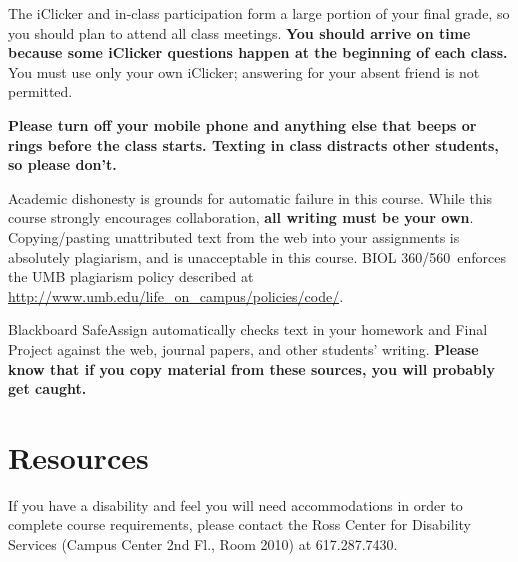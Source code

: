 \documentclass[12pt]{article}
\newcommand{\course}{BIOL 360/560}
\begin{document}
The iClicker and in-class participation form a large portion of your final
grade, so you should plan to attend all class meetings.  \textbf{You should
  arrive on time because some iClicker questions happen at the beginning of each
  class.}  You must use only your own iClicker; answering for your absent
friend is not permitted.


\textbf{Please turn off your mobile phone and anything else that beeps or rings before
the class starts.  Texting in class distracts other students, so please don't.}


Academic dishonesty is grounds for automatic failure in this course.  While this
course strongly encourages collaboration, \textbf{all writing must be your own}.
Copying/pasting unattributed text from the web into your assignments is
absolutely plagiarism, and is unacceptable in this course.   \course\ enforces
the UMB plagiarism policy described at
\url{http://www.umb.edu/life_on_campus/policies/code/}.


Blackboard SafeAssign automatically checks text in your homework and Final
Project against the web, journal papers, and other students'
writing. \textbf{Please know that if
  you copy material from these sources, you will probably get caught.}


\section{Resources}
\label{sec:resources}

If you have a disability and feel you will need accommodations in order to
complete course requirements, please contact the Ross Center for Disability
Services (Campus Center 2nd Fl., Room 2010) at 617.287.7430.
\end{document}
